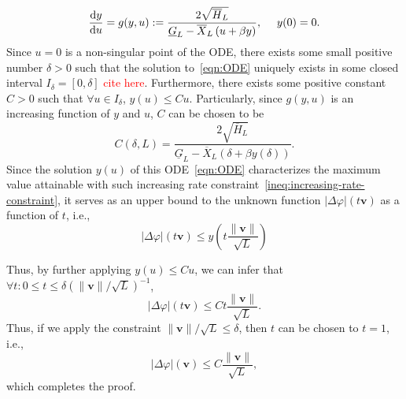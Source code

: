 \documentclass[a4paper,12pt]{article}
\def \d {{\rm d}}
\newcommand{\red}[1]{\textcolor{red}{#1}}
\begin{document}
\begin{equation}
    \frac{\d y}{\d u} = g(y, u) := \frac{2\sqrt{\overline{H}_L}}{\underline{G}_L - \overline{X}_L\left(u+\beta y\right)}, ~~~~y(0)=0.  \label{eqn:ODE}
\end{equation}
Since $u=0$ is a non-singular point of the ODE, there exists some small positive number $\delta>0$ such that the solution to~\eqref{eqn:ODE} uniquely exists in some closed interval $I_{\delta} = [0,\delta]$ \red{cite here}. Furthermore, there exists some positive constant $C>0$ such that $\forall u\in I_{\delta}$, $y(u)\leq Cu$. Particularly, since $g(y,u)$ is an increasing function of $y$ and $u$, $C$ can be chosen to be 
\begin{equation}
    C(\delta, L) = \frac{2\sqrt{\overline{H}_L}}{\underline{G}_L-\overline{X}_L (\delta+\beta y(\delta))}. 
\end{equation} 
Since the solution $y(u)$ of this ODE~\eqref{eqn:ODE} characterizes the maximum value attainable with such increasing rate constraint~\eqref{ineq:increasing-rate-constraint}, it serves as an upper bound to the unknown function $|\Delta\varphi|(t{\bm v})$ as a function of $t$, i.e., 
\begin{equation}
    |\Delta\varphi|(t{\bm v}) \leq y\left(t\frac{\|{\bm v}\|}{\sqrt{L}}\right)
\end{equation}

Thus, by further applying $y(u)\leq Cu$, we can infer that $\forall t: 0\leq t \leq \delta (\|{\bm v}\|/\sqrt{L})^{-1}$,
\begin{equation}
    |\Delta\varphi|(t{\bm v}) \leq C t\frac{\|{\bm v}\|}{\sqrt{L}}.
\end{equation} 
Thus, if we apply the constraint $\|{\bm v}\|/\sqrt{L}\leq \delta$, then $t$ can be chosen to $t=1$, i.e., 
\begin{equation}
    |\Delta\varphi|({\bm v}) \leq C \frac{\|{\bm v}\|}{\sqrt{L}},
\end{equation}
which completes the proof. 
\end{document}
